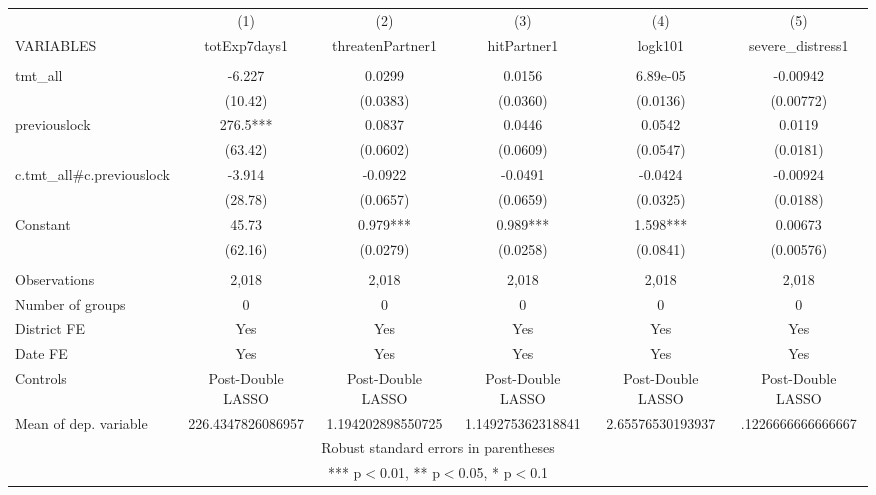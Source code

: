 \documentclass[]{article}
\begin{document}
\begin{tabular}{lccccc} \hline
 & (1) & (2) & (3) & (4) & (5) \\
VARIABLES & totExp7days1 & threatenPartner1 & hitPartner1 & logk101 & severe\_distress1 \\ \hline
 &  &  &  &  &  \\
tmt\_all & -6.227 & 0.0299 & 0.0156 & 6.89e-05 & -0.00942 \\
 & (10.42) & (0.0383) & (0.0360) & (0.0136) & (0.00772) \\
previouslock & 276.5*** & 0.0837 & 0.0446 & 0.0542 & 0.0119 \\
 & (63.42) & (0.0602) & (0.0609) & (0.0547) & (0.0181) \\
c.tmt\_all\#c.previouslock & -3.914 & -0.0922 & -0.0491 & -0.0424 & -0.00924 \\
 & (28.78) & (0.0657) & (0.0659) & (0.0325) & (0.0188) \\
Constant & 45.73 & 0.979*** & 0.989*** & 1.598*** & 0.00673 \\
 & (62.16) & (0.0279) & (0.0258) & (0.0841) & (0.00576) \\
 &  &  &  &  &  \\
Observations & 2,018 & 2,018 & 2,018 & 2,018 & 2,018 \\
Number of groups & 0 & 0 & 0 & 0 & 0 \\
District FE & Yes & Yes & Yes & Yes & Yes \\
Date FE & Yes & Yes & Yes & Yes & Yes \\
Controls & Post-Double LASSO & Post-Double LASSO & Post-Double LASSO & Post-Double LASSO & Post-Double LASSO \\
 Mean of dep. variable & 226.4347826086957 & 1.194202898550725 & 1.149275362318841 & 2.65576530193937 & .1226666666666667 \\ \hline
\multicolumn{6}{c}{ Robust standard errors in parentheses} \\
\multicolumn{6}{c}{ *** p$<$0.01, ** p$<$0.05, * p$<$0.1} \\
\end{tabular}
\end{document}
